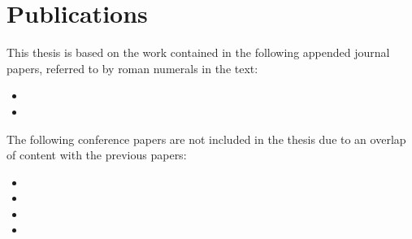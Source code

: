 \newpage\section*{Publications}

This thesis is based on the work contained in the following appended journal papers,
referred to by roman numerals in the text:
\begin{itemize}
 \item {} %
 \item {} %
\end{itemize}
The following conference papers are not included in the thesis due to an overlap
of content with the previous papers:
\begin{itemize}
 \item {} %
 \item {} %
 \item {} %
 \item {} %
\end{itemize}
